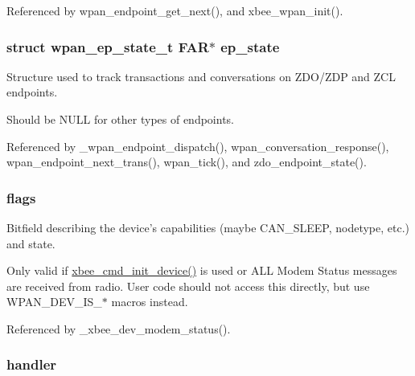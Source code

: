Referenced by wpan\-\_\-endpoint\-\_\-get\-\_\-next(), and xbee\-\_\-wpan\-\_\-init().

\hypertarget{group__wpan__aps_ga389966cb276b33004b14ee698c270347}{
\subsubsection[{ep\-\_\-state}]{\setlength{\rightskip}{0pt plus 5cm}struct {\bf wpan\-\_\-ep\-\_\-state\-\_\-t} {\bf F\-A\-R}$\ast$ ep\-\_\-state}}\label{group__wpan__aps_ga389966cb276b33004b14ee698c270347}


Structure used to track transactions and conversations on Z\-D\-O/\-Z\-D\-P and Z\-C\-L endpoints. 

Should be N\-U\-L\-L for other types of endpoints. 

Referenced by \-\_\-wpan\-\_\-endpoint\-\_\-dispatch(), wpan\-\_\-conversation\-\_\-response(), wpan\-\_\-endpoint\-\_\-next\-\_\-trans(), wpan\-\_\-tick(), and zdo\-\_\-endpoint\-\_\-state().

\hypertarget{group__wpan__aps_ga1e87af3c18a2fd36c61faf89949bdc3f}{
\subsubsection[{flags}]{ flags}}\label{group__wpan__aps_ga1e87af3c18a2fd36c61faf89949bdc3f}


Bitfield describing the device's capabilities (maybe C\-A\-N\-\_\-\-S\-L\-E\-E\-P, nodetype, etc.) and state. 

Only valid if \hyperlink{group__xbee__atcmd_ga1cc803f821ed44e27e404d38349f53c7}{xbee\-\_\-cmd\-\_\-init\-\_\-device()} is used or A\-L\-L Modem Status messages are received from radio. User code should not access this directly, but use W\-P\-A\-N\-\_\-\-D\-E\-V\-\_\-\-I\-S\-\_\-$\ast$ macros instead. 

Referenced by \-\_\-xbee\-\_\-dev\-\_\-modem\-\_\-status().

\hypertarget{group__wpan__aps_gab0c5e32241c4c2860c728aeab4b6f253}{
\subsubsection[{handler}]{ handler}}\label{group__wpan__aps_gab0c5e32241c4c2860c728aeab4b6f253}


